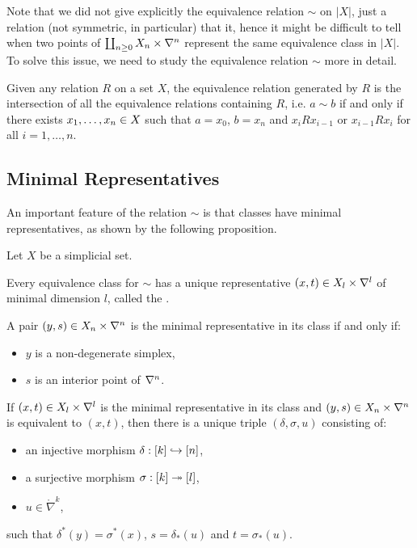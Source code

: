 Note that we did not give explicitly the equivalence relation $\sim$ on $|X|$, just a relation (not symmetric, in particular) that  it,
hence it might be difficult to tell when two points of $\coprod_{n\ge0} X_n\times\nabla^n$ represent the same equivalence class in $|X|$.
To solve this issue, we need to study the equivalence relation $\sim$ more in detail.

\begin{remark*}
Given any relation $R$ on a set $X$, the equivalence relation generated by $R$ is the intersection of all the equivalence relations containing $R$, i.e. $a\sim b$ if and only if there exists ${x_1,\dots,x_n}\in X$ such that $a=x_0$, $b=x_n$ and $x_iRx_{i-1}$ or $x_{i-1}Rx_i$ for all $i=1,\dots,n$.
\end{remark*}

\subsection{Minimal Representatives}\label{subsection:minimal-representatives}

An important feature of the relation $\sim$ is that classes have minimal representatives, as shown by the following proposition.

\begin{proposition}\label{proposition:minimal-representatives}
Let $X$ be a simplicial set.
\begin{numerate}
\item Every equivalence class for $\sim$ has a unique representative $(x,t)\in X_l\times\nabla^{l}$ of minimal dimension $l$, called the .
\item A pair $(y,s)\in X_n\times\nabla^n$ is the minimal representative in its class if and only if:
\begin{itemize}[label={-}]
    \item $y$ is a non-degenerate simplex,
    \item $s$ is an interior point of $\nabla^n$.
\end{itemize}
\item If $(x,t)\in X_l\times\nabla^{l}$ is the minimal representative in its class and $(y,s)\in X_n\times\nabla^n$ is equivalent to $(x,t)$, then there is a unique triple $(\delta,\sigma,u)$ consisting of:
\begin{itemize}[label={-}]
    \item an injective morphism $\delta:[k]\hookrightarrow[n]$,
    \item a surjective morphism $\sigma:[k]\twoheadrightarrow[l]$,
    \item $u\in\ring\nabla^{k}$,
\end{itemize}
such that $\delta^*(y)=\sigma^*(x)$, $s=\delta_*(u)$ and $t=\sigma_*(u)$.
\end{numerate}
\end{proposition}

